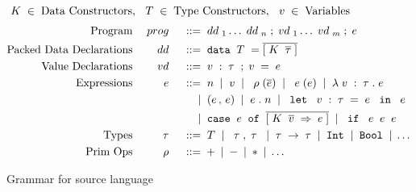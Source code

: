 \begin{figure*}
    \begin{displaymath}
    \; {K} \; \in \; \textup{Data Constructors}, \:\: \; {T} \; \in \; \textup{Type Constructors}, \:\: \; v \; \in \; \textup{Variables}
  \end{displaymath} 
  \begin{displaymath}
    \begin{aligned}
      \textup{Program} && \; {prog} \; && \; ::= \; & \; {dd} \;_1 \ldots \; {dd} \;_n \; ; \; {vd} \;_1 \ldots \; {vd} \;_m \; ; \; {e} \; \\
      \textup{Packed Data Declarations} && \; {dd} \; && \; ::= \; & \; \texttt{data} \; \; {T} \; = \overline{[\; {K} \; \; \overline{\tau}\;]} \\
      \textup{Value Declarations} && \; {vd} \; && \; ::= \; & \; v \; : \; {\tau} \; \; ; \; v \; = \; {e} \; \\ 
      \textup{Expressions} && \; {e} \; && \; ::= \; & \; n \; \; | \; \; v \; \; | \; \; \; {\rho} \;(\overline{e}) \; \; | \; \; \; {e} \;(e) \; \; | \; \; \lambda {\; v\;:\; {\tau} \;} . {\; {e} \;} \; \\
      && && \; | \; & \; ({e} \,,\, {e}) \; \; | \; \; {e} \;.\; n \; \; | \; \;\; \texttt{let} \; \; \; v \;:\; {\tau} \; = \; {e} \; \; \; \texttt{in} \; \; \; {e} \; \; \\
      && && \; | \; & \; \texttt{case} \;\; e\; \; \texttt{of} \;\; \overline{[{\; {K} \; \; \overline{v} \;} \Rightarrow {\; {e} \;}]} \; \; | \;  \; \; \texttt{if} \;\; \; {e} \; \; {e} \; \; {e} \; \; \\
      \textup{Types} && \; {\tau} \; && \; ::= \; &
      \; {T} \; \; | \; \; {\; {\tau} \;}, {\; {\tau} \;} \; \; | \; \; {\tau} \; \rightarrow \; {\tau} \;
      \; | \; \; \texttt{Int} \; \; | \; \; \texttt{Bool} \; \; | \; \dots
      \\
      \textup{Prim Ops} && \; {\rho} \; && \; ::= \; & + \; | \; - \; | \; * \; | \; \ldots \\
    \end{aligned}
  \end{displaymath}
  \caption{Grammar for source language}
  \label{fig:source}
\end{figure*}


